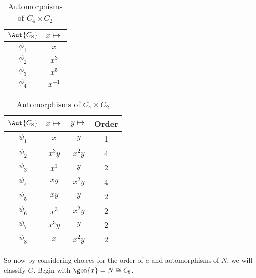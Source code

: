 \begin{table}
    \begin{minipage}{0.5\linewidth}
        \caption{Automorphisms of \(C_8\)}\label{tab:aut_C8}
        \centering
        \begin{tabular}{c|c}
            \(\Aut{C_8}\) & \(x \mapsto\) \\
            \midrule
            \(\phi_1\) & \(x\) \\
            \(\phi_2\) & \(x^3\) \\
            \(\phi_3\) & \(x^5\) \\
            \(\phi_4\) & \(x^{-1}\)
        \end{tabular}
    \end{minipage}
    \begin{minipage}{0.5\linewidth}
        \caption{Automorphisms of \(C_4 \times C_2\)}\label{tab:aut_C4xC2}
        \centering
        \begin{tabular}{c|c|c|c}
            \(\Aut{C_8}\) & \(x \mapsto\) & \(y \mapsto\) & Order \\
            \midrule
            \(\psi_1\) & \(x\) & \(y\) & 1\\
            \(\psi_2\) & \(x^3 y\) & \(x^2 y\) & 4 \\
            \(\psi_3\) & \(x^3\) & \(y\) & 2 \\
            \(\psi_4\) & \(xy\) & \(x^2 y\) & 4 \\
            \(\psi_5\) & \(xy\) & \(y\) & 2 \\
            \(\psi_6\) & \(x^3\) & \(x^2 y\) & 2\\
            \(\psi_7\) & \(x^3 y\) & \(y\) & 2 \\
            \(\psi_8\) & \(x\) & \(x^2 y\) & 2 \\
        \end{tabular}
    \end{minipage}
\end{table}

So now by considering choices for the order of \(a\) and automorphisms of \(N\), we will classify \(G\).
Begin with \(\gen{x} = N \cong C_8\).

